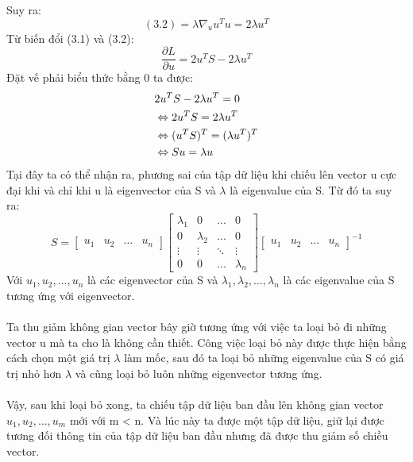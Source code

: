 Suy ra:
\[ (3.2) = \lambda \nabla_uu^Tu = 2\lambda u^T \]
Từ biến đổi (3.1) và (3.2):
\[ \frac{\partial L}{\partial u} = 2u^TS - 2\lambda u^T \]
Đặt vế phải biểu thức bằng 0 ta được:
\begin{align}
& 2u^TS - 2\lambda u^T = 0\notag\\
&\Leftrightarrow 2u^TS = 2\lambda u^T\notag\\
&\Leftrightarrow (u^TS)^T = (\lambda u^T)^T\notag\\
&\Leftrightarrow Su = \lambda u\notag
\end{align}
Tại đây ta có thể nhận ra, phương sai của tập dữ liệu khi chiếu lên vector u cực
đại khi và chỉ khi u là eigenvector của S và $\lambda$ là eigenvalue của S. Từ
đó ta suy ra:
\[ S= 
\begin{bmatrix}
u_1 & u_2 & \dots & u_n
\end{bmatrix} 
\begin{bmatrix}
\lambda_1 & 0 & \dots & 0 \\
0 & \lambda_2 & \dots & 0 \\
\vdots & \vdots & \ddots & \vdots \\
0 & 0 & \dots & \lambda_n 
\end{bmatrix}
\begin{bmatrix}
u_1 & u_2 & \dots & u_n
\end{bmatrix} ^{-1}
\]
Với $u_1,u_2,\dots,u_n$ là các eigenvector của S và
$\lambda_1,\lambda_2,\dots,\lambda_n$ là các eigenvalue của S tương ứng với
eigenvector.\\\\ 
Ta thu giảm không gian vector bây giờ tương ứng với việc ta loại bỏ đi những
vector u mà ta cho là không cần thiết. Công việc loại bỏ này được thực hiện bằng
cách chọn một giá trị $\lambda$ làm mốc, sau đó ta loại bỏ những eigenvalue của
S có giá trị nhỏ hơn $\lambda$ và cũng loại bỏ luôn những eigenvector tương
ứng.\\\\ 
Vậy, sau khi loại bỏ xong, ta chiếu tập dữ liệu ban đầu lên không gian vector
$u_1,u_2,\dots,u_m$ mới với m < n. Và lúc này ta được một tập dữ liệu, giữ lại
được tương đối thông tin của tập dữ liệu ban đầu nhưng đã được thu giảm số chiều vector.
